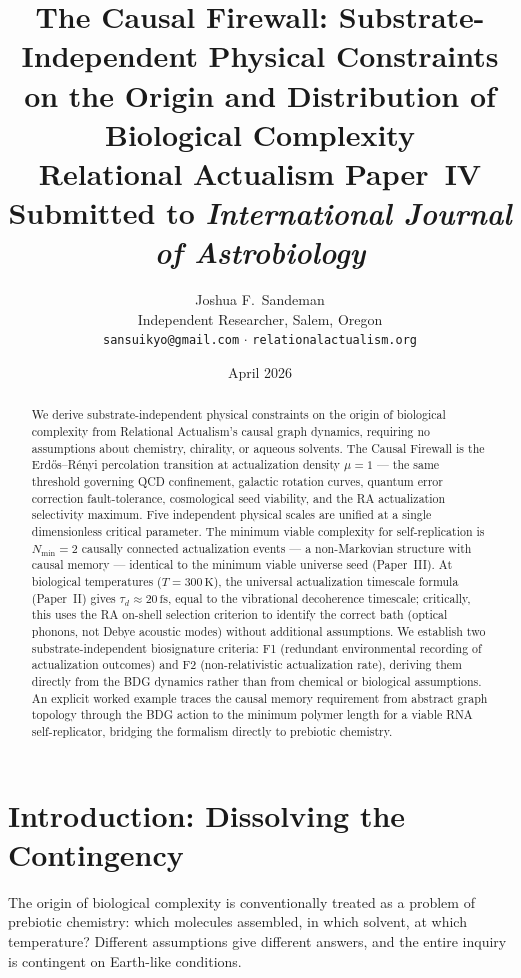 \documentclass[12pt,a4paper]{article}
\title{\textbf{The Causal Firewall: Substrate-Independent Physical Constraints\\
on the Origin and Distribution of Biological Complexity}\\[0.4em]
\large\normalfont Relational Actualism Paper~IV\\
\normalsize Submitted to \textit{International Journal of Astrobiology}}
\author{Joshua F.~Sandeman\\[0.3em]
\small Independent Researcher, Salem, Oregon\\
\small \texttt{sansuikyo@gmail.com} $\cdot$ \texttt{relationalactualism.org}}
\date{April 2026}
\begin{document}
\maketitle
\begin{abstract}
We derive substrate-independent physical constraints on the origin of biological complexity from Relational Actualism's causal graph dynamics, requiring no assumptions about chemistry, chirality, or aqueous solvents.  The Causal Firewall is the Erd\H{o}s--R\'enyi percolation transition at actualization density $\mu=1$ — the same threshold governing QCD confinement, galactic rotation curves, quantum error correction fault-tolerance, cosmological seed viability, and the RA actualization selectivity maximum.  Five independent physical scales are unified at a single dimensionless critical parameter.  The minimum viable complexity for self-replication is $N_{\min}=2$ causally connected actualization events — a non-Markovian structure with causal memory — identical to the minimum viable universe seed (Paper~III).  At biological temperatures ($T=300\,\mathrm{K}$), the universal actualization timescale formula (Paper~II) gives $\tau_d \approx 20\,\mathrm{fs}$, equal to the vibrational decoherence timescale; critically, this uses the RA on-shell selection criterion to identify the correct bath (optical phonons, not Debye acoustic modes) without additional assumptions.  We establish two substrate-independent biosignature criteria: F1 (redundant environmental recording of actualization outcomes) and F2 (non-relativistic actualization rate), deriving them directly from the BDG dynamics rather than from chemical or biological assumptions.  An explicit worked example traces the causal memory requirement from abstract graph topology through the BDG action to the minimum polymer length for a viable RNA self-replicator, bridging the formalism directly to prebiotic chemistry.
\end{abstract}

\tableofcontents

\section{Introduction: Dissolving the Contingency}

The origin of biological complexity is conventionally treated as a problem of prebiotic chemistry: which molecules assembled, in which solvent, at which temperature?  Different assumptions give different answers, and the entire inquiry is contingent on Earth-like conditions.
\end{document}
